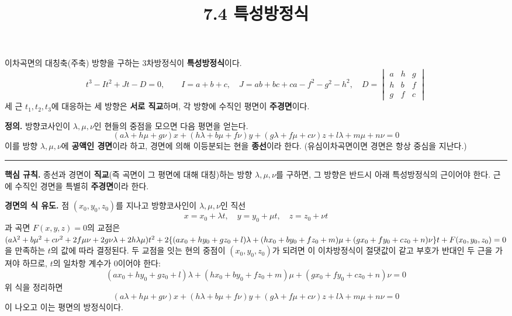 \documentclass{article}
\title{7.4 특성방정식}
\date{}
\author{}
\theoremstyle{mystyle}
\begin{document}
\maketitle

\begin{tcolorbox}[colback=blue!5, colframe=blue!60!black, title=7.4 특성방정식 -- 한눈에 보기, boxrule=0.5mm, arc=3mm]
이차곡면의 대칭축(주축) 방향을 구하는 3차방정식이 \textbf{특성방정식}이다.
\[
t^3-It^2+Jt-D=0,\qquad I=a+b+c,\quad J=ab+bc+ca-f^2-g^2-h^2,\quad D=\begin{vmatrix}a&h&g\\h&b&f\\g&f&c\end{vmatrix}
\]
세 근 \(t_1,t_2,t_3\)에 대응하는 세 방향은 \textbf{서로 직교}하며, 각 방향에 수직인 평면이 \textbf{주경면}이다.
\end{tcolorbox}

\begin{tcolorbox}[
    colback=teal!4,
    colframe=teal!65!black,
    title=정의 \& 핵심 규칙,
    fonttitle=\bfseries,
    boxrule=0.5mm,
    arc=3mm
    ]
    \textbf{\textcolor{teal!65!black}{정의.}}\quad
    방향코사인이 \(\lambda,\mu,\nu\)인 현들의 중점을 모으면 다음 평면을 얻는다.
    \[
    (a\lambda+h\mu+g\nu)x+(h\lambda+b\mu+f\nu)y+(g\lambda+f\mu+c\nu)z+l\lambda+m\mu+n\nu=0 \tag{①}
    \]
    이를 방향 \(\lambda,\mu,\nu\)에 \textbf{공액인 경면}이라 하고, 경면에 의해 이등분되는 현을 \textbf{종선}이라 한다. (유심이차곡면이면 경면은 항상 중심을 지난다.)

    \noindent\textcolor{teal!50!black}{\rule{\linewidth}{0.4pt}}

    \textbf{\textcolor{teal!65!black}{핵심 규칙.}}\quad
    종선과 경면이 \textbf{직교}(즉 곡면이 그 평면에 대해 대칭)하는 방향 \(\lambda,\mu,\nu\)를 구하면, 그 방향은 반드시 아래 특성방정식의 근이어야 한다. 근에 수직인 경면을 특별히 \textbf{주경면}이라 한다.
\end{tcolorbox}
\textbf{경면의 식 유도.}  점 \((x_0,y_0,z_0)\)를 지나고 방향코사인이 \(\lambda,\mu,\nu\)인 직선
\[
x=x_0+\lambda t,\quad y=y_0+\mu t,\quad z=z_0+\nu t
\]
과 곡면 \(F(x,y,z)=0\)의 교점은 \\
$(a\lambda^2+b\mu^2+c\nu^2+2f\mu\nu+2g\nu\lambda+2h\lambda\mu)t^2 \\
+2\{(ax_0+hy_0+gz_0+l)\lambda+(hx_0+by_0+fz_0+m)\mu+(gx_0+fy_0+cz_0+n)\nu\}t \\
+F(x_0,y_0,z_0)=0$ \\
을 만족하는 \(t\)의 값에 따라 결정된다. 두 교점을 잇는 현의 중점이 \((x_0,y_0,z_0)\)가 되려면 이 이차방정식이 절댓값이 같고 부호가 반대인 두 근을 가져야 하므로, \(t\)의 일차항 계수가 0이어야 한다:
\[
(ax_0+hy_0+gz_0+l)\lambda+(hx_0+by_0+fz_0+m)\mu+(gx_0+fy_0+cz_0+n)\nu=0
\]
위 식을 정리하면 
\[
(a\lambda+h\mu+g\nu)x+(h\lambda+b\mu+f\nu)y+(g\lambda+f\mu+c\nu)z+l\lambda+m\mu+n\nu=0 \tag{①}
\]
이 나오고 이는 평면의 방정식이다. 
\end{document}
